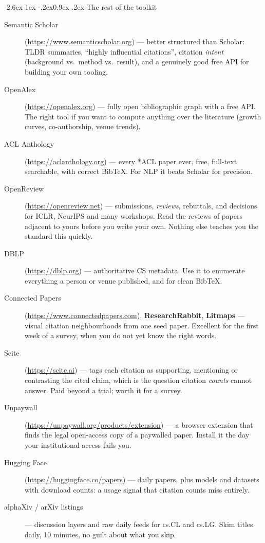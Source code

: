 \documentclass[11pt,a4paper]{article}
\makeatletter
\renewcommand\subsection{\@startsection{subsection}{2}{\z@}%
  {-2.6ex\@plus -1ex \@minus -.2ex}{0.9ex \@plus .2ex}%
  {\normalfont\large\bfseries\color{brandlight}}}
\makeatother
\begin{document}
\subsection{The rest of the toolkit}

\begin{description}
  \item[Semantic Scholar] (\url{https://www.semanticscholar.org}) --- better
        structured than Scholar: TLDR summaries, ``highly influential
        citations'', citation \emph{intent} (background vs.\ method vs.\
        result), and a genuinely good free API for building your own tooling.
  \item[OpenAlex] (\url{https://openalex.org}) --- fully open bibliographic
        graph with a free API. The right tool if you want to compute anything
        over the literature (growth curves, co-authorship, venue trends).
  \item[ACL Anthology] (\url{https://aclanthology.org}) --- every *ACL paper
        ever, free, full-text searchable, with correct BibTeX. For NLP it
        beats Scholar for precision.
  \item[OpenReview] (\url{https://openreview.net}) --- submissions,
        \emph{reviews}, rebuttals, and decisions for ICLR, NeurIPS and many
        workshops. Read the reviews of papers adjacent to yours before you
        write your own. Nothing else teaches you the standard this quickly.
  \item[DBLP] (\url{https://dblp.org}) --- authoritative CS metadata. Use it
        to enumerate everything a person or venue published, and for clean
        BibTeX.
  \item[Connected Papers] (\url{https://www.connectedpapers.com}),
        \textbf{ResearchRabbit}, \textbf{Litmaps} --- visual citation
        neighbourhoods from one seed paper. Excellent for the first week of a
        survey, when you do not yet know the right words.
  \item[Scite] (\url{https://scite.ai}) --- tags each citation as
        supporting, mentioning or contrasting the cited claim, which is the
        question citation \emph{counts} cannot answer. Paid beyond a trial;
        worth it for a survey.
  \item[Unpaywall] (\url{https://unpaywall.org/products/extension}) --- a
        browser extension that finds the legal open-access copy of a paywalled
        paper. Install it the day your institutional access fails you.
  \item[Hugging Face] (\url{https://huggingface.co/papers}) --- daily papers,
        plus models and datasets with download counts: a usage signal that
        citation counts miss entirely.
  \item[alphaXiv / arXiv listings] --- discussion layers and raw daily feeds
        for cs.CL and cs.LG. Skim titles daily, 10 minutes, no guilt about
        what you skip.
\end{description}
\end{document}
